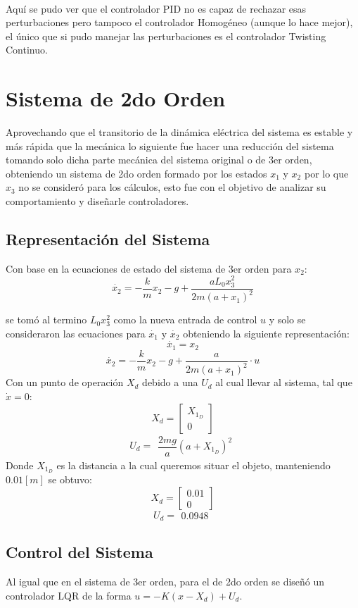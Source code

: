 \documentclass[onecolumn,10pt]{article}
\begin{document}
\\
Aqu\'i se pudo ver que el controlador PID no es capaz de rechazar esas perturbaciones pero tampoco el controlador Homog\'eneo (aunque lo hace mejor), el \'unico que si pudo manejar las perturbaciones es el controlador Twisting Continuo.

\section{Sistema de 2do Orden}
Aprovechando que el transitorio de la din\'amica el\'ectrica del sistema es estable y m\'as r\'apida que la mec\'anica lo siguiente fue hacer una reducci\'on del sistema tomando solo dicha parte mec\'anica del sistema original o de 3er orden, obteniendo un sistema de 2do orden formado por los estados $x_1$  y $x_2$ por lo que $x_3$ no se consider\'o para los c\'alculos, esto fue con el objetivo de analizar su comportamiento y dise\~narle controladores.
\subsection*{Representaci\'on del Sistema}
Con base en la ecuaciones de estado del sistema de 3er orden para $x_2$:
$$\dot{x_2}=-\dfrac{k}{m}x_2 -g  +\dfrac{aL_0x_3^{2}}{2m(a+x_1)^{2}}$$

se tom\'o al termino $L_0x_3^{2}$ como la nueva entrada de control $u$ y solo se consideraron las ecuaciones para $\dot{x_1}$ y $\dot{x_2}$ obteniendo la siguiente representaci\'on:
$$
\dot{x_1}=x_2 
$$
$$
\dot{x_2}=-\dfrac{k}{m}x_2  -g  +\dfrac{a}{2m(a+x_1)^{2}}\cdot u
$$
Con un punto de operaci\'on $X_d$ debido a una $U_d$ al cual llevar al sistema, tal que $\dot{x}=0$:
$$
X_{d}=\begin{bmatrix}
X_{1_{D}} \\ 0  
\end{bmatrix}
$$
$$
U_{d}=\begin{matrix}
\dfrac{2mg}{a}(a+X_{1_{D}})^{2}
\end{matrix}
$$
Donde $X_{1_{D}}$ es la distancia a la cual queremos situar el objeto, manteniendo $0.01[m]$ se obtuvo:
$$
X_{d}=\begin{bmatrix}
0.01 \\ 0  
\end{bmatrix}
$$
$$
U_{d}=\begin{matrix}
0.0948
\end{matrix}
$$

\subsection*{Control del Sistema}
Al igual que en el sistema de 3er orden, para el de 2do orden se dise\~n\'o un controlador LQR de la forma $u=-K(x-X_{d})+U_{d}$.
\end{document}
